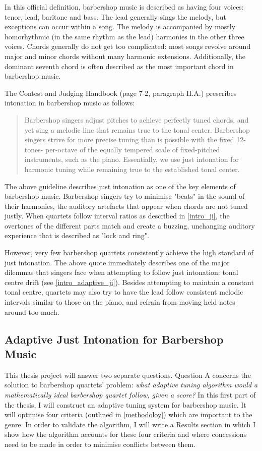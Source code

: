 \documentclass[a4paper]{article}
\begin{document}
In this official definition, barbershop music is described as having four voices: tenor, lead, baritone and bass. The lead generally sings the melody, but exceptions can occur within a song. The melody is accompanied by mostly homorhythmic (in the same rhythm as the lead) harmonies in the other three voices. Chords generally do not get too complicated: most songs revolve around major and minor chords without many harmonic extensions. Additionally, the dominant seventh chord is often described as the most important chord in barbershop music.

The Contest and Judging Handbook (page 7-2, paragraph II.A.) prescribes intonation in barbershop music as follows:
\begin{quote}
	Barbershop singers adjust pitches to achieve perfectly tuned chords, and yet sing a melodic line that remains true to the tonal center. Barbershop singers strive for more precise tuning than is possible with the fixed 12-tones- per-octave of the equally tempered scale of fixed-pitched instruments, such as the piano. Essentially, we use just intonation for harmonic tuning while remaining true to the established tonal center.\cite{barbershop_harmony_society_contest_2022}
\end{quote}
The above guideline describes just intonation as one of the key elements of barbershop music. Barbershop singers try to minimise "beats" in the sound of their harmonies, the auditory artefacts that appear when chords are not tuned justly. When quartets follow interval ratios as described in \ref{intro_ji}, the overtones of the different parts match and create a buzzing, unchanging auditory experience that is described as "lock and ring".

However, very few barbershop quartets consistently achieve the high standard of just intonation.\cite{garnett_ethics_1999} The above quote immediately describes one of the major dilemmas that singers face when attempting to follow just intonation: tonal centre drift (see \ref{intro_adaptive_ji}). Besides attempting to maintain a constant tonal centre, quartets may also try to have the lead follow consistent melodic intervals similar to those on the piano, and refrain from moving held notes around too much.

\subsection{Adaptive Just Intonation for Barbershop Music}
\label{intro_aji_for_bs}
This thesis project will answer two separate questions. Question A concerns the solution to barbershop quartets' problem: {\it what adaptive tuning algorithm would a mathematically ideal barbershop quartet follow, given a score?} In this first part of the thesis, I will construct an adaptive tuning system for barbershop music. It will optimise four criteria (outlined in \ref{methodoloy}) which are important to the genre. In order to validate the algorithm, I will write a Results section in which I show how the algorithm accounts for these four criteria and where concessions need to be made in order to minimise conflicts between them.
\end{document}
